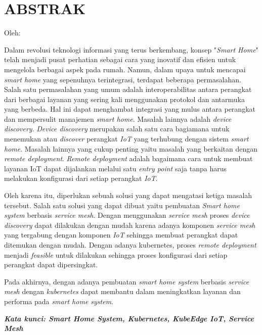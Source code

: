 \clearpage
\chapter*{ABSTRAK}
\begin{center}
  \center
  \begin{singlespace}
    \large\bfseries\MakeUppercase{\thetitle}
    
    \normalfont\normalsize
    Oleh:
    
    \bfseries \theauthor
  \end{singlespace}
\end{center}

\begin{singlespace}
  \small
  Dalam revolusi teknologi informasi yang terus berkembang, konsep "\textit{Smart Home}" telah menjadi pusat perhatian sebagai cara yang inovatif dan efisien untuk mengelola berbagai aspek pada rumah. Namun, dalam upaya untuk mencapai \textit{smart home} yang sepenuhnya terintegrasi, terdapat beberapa permasalahan. Salah satu permasalahan yang umum adalah interoperabilitas antara perangkat dari berbagai layanan yang sering kali menggunakan protokol dan antarmuka yang berbeda. Hal ini dapat menghambat integrasi yang mulus antara perangkat dan mempersulit manajemen \textit{smart home}. Masalah lainnya adalah \textit{device discovery}. \textit{Device discovery} merupakan salah satu cara bagiamana untuk menemukan atau \textit{discover} perangkat \textit{IoT} yang terhubung dengan sistem \textit{smart home}. Masalah lainnya yang cukup penting yaitu masalah yang berkaitan dengan \textit{remote deployment}. \textit{Remote deployment} adalah bagaimana cara untuk membuat layanan IoT dapat dijalankan melalui satu \textit{entry point} saja tanpa harus melakukan konfigurasi dari setiap perangkat \textit{IoT}. 
  
  Oleh karena itu, diperlukan sebuah solusi yang dapat mengatasi ketiga masalah tersebut. Salah satu solusi yang dapat dibuat yaitu pembuatan \textit{Smart home system} berbasis \textit{service mesh}. Dengan menggunakan \textit{service mesh} proses \textit{device discovery} dapat dilakukan dengan mudah karena adanya komponen \textit{service mesh} yang tergabung dengan komponen \textit{IoT} sehingga membuat perangkat dapat ditemukan dengan mudah. Dengan adanya kubernetes, proses \textit{remote deployment} menjadi \textit{feasible} untuk dilakukan sehingga proses konfigurasi dari setiap perangkat dapat dipersingkat.
  
  Pada akhirnya, dengan adanya pembuatan \textit{smart home system} berbasis \textit{service mesh} dengan \textit{kubernetes} dapat membantu dalam meningkatkan layanan dan performa pada \textit{smart home system}.

  \textbf{\textit{Kata kunci: Smart Home System, Kubernetes, KubeEdge IoT, Service Mesh}}
  
\end{singlespace}
\clearpage